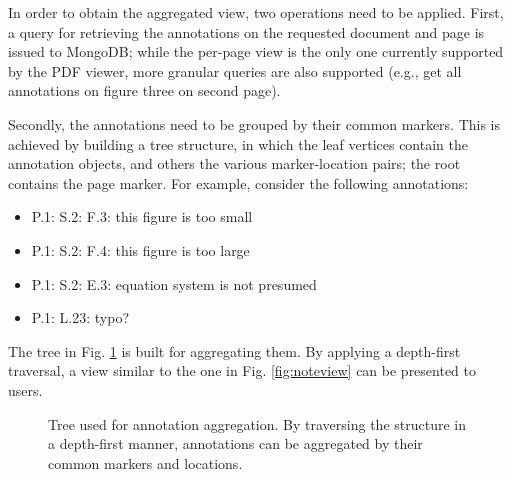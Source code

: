 In order to obtain the aggregated view, two operations need to be applied.
First, a query for retrieving the annotations on the requested document and
page is issued to MongoDB; while the per-page view is the only one currently
supported by the PDF viewer, more granular queries are also supported (e.g., get
all annotations on figure three on second page).

Secondly, the annotations need to be grouped by their common markers. This is
achieved by building a tree structure, in which the leaf vertices contain the
annotation objects, and others the various marker-location pairs; the root contains
the page marker. For example, consider the following annotations:
\begin{itemize}
    \item P.1: S.2: F.3: this figure is too small
    \item P.1: S.2: F.4: this figure is too large
    \item P.1: S.2: E.3: equation system is not presumed
    \item P.1: L.23: typo?
\end{itemize}
The tree in Fig. \ref{fig:tree} is built for aggregating them. By applying a
depth-first traversal, a view similar to the one in Fig.  \ref{fig:noteview}
can be presented to users.

\begin{figure}[!ht]
  \centering
  \caption[Tree used for annotation aggregation.]
          {Tree used for annotation aggregation. By traversing the structure in
           a  depth-first manner, annotations can be aggregated by their common
           markers and locations.}
  \label{fig:tree}
\end{figure}
